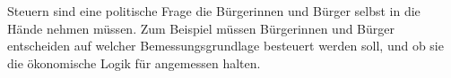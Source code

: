 Steuern sind eine politische Frage die Bürgerinnen und Bürger selbst in die Hände nehmen müssen.
Zum Beispiel müssen Bürgerinnen und Bürger entscheiden auf welcher Bemessungsgrundlage besteuert werden soll, und ob sie die ökonomische Logik für angemessen halten.